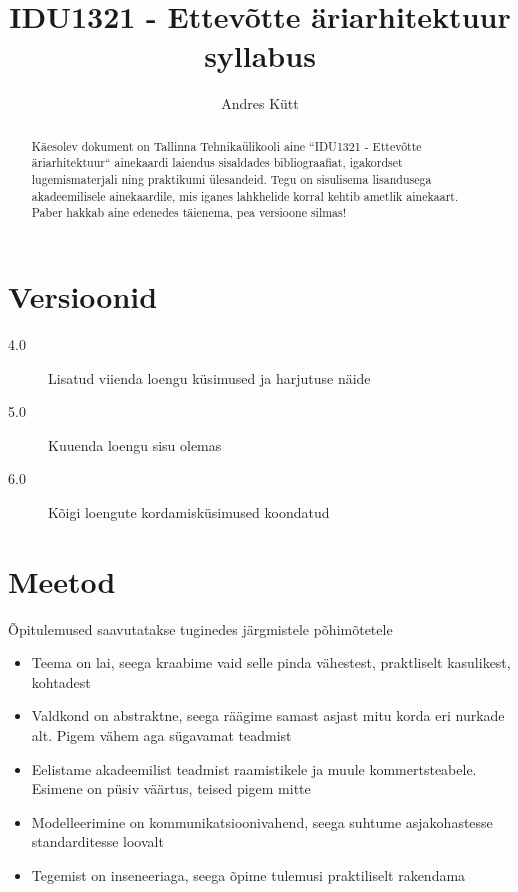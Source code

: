 \documentclass[nobib]{tufte-handout}
\title{IDU1321 - Ettevõtte äriarhitektuur syllabus}
\author[Andres Kütt]{Andres Kütt}
\begin{document}
\maketitle
\begin{abstract}
\noindent
Käesolev dokument on Tallinna Tehnikaülikooli aine ``IDU1321 - Ettevõtte äriarhitektuur`` ainekaardi laiendus sisaldades bibliograafiat, igakordset lugemismaterjali ning praktikumi ülesandeid. Tegu on sisulisema lisandusega akadeemilisele ainekaardile, mis iganes lahkhelide korral kehtib ametlik ainekaart. Paber hakkab aine edenedes täienema, pea versioone silmas!
\end{abstract}

\section{Versioonid}
\begin{description}
	\item[4.0] Lisatud viienda loengu küsimused ja harjutuse näide
	\item[5.0] Kuuenda loengu sisu olemas
	\item[6.0] Kõigi loengute kordamisküsimused koondatud
\end{description}

\section{Meetod}
Õpitulemused saavutatakse tuginedes järgmistele põhimõtetele
\begin{itemize}
	\item Teema on lai, seega kraabime vaid selle pinda vähestest, praktliselt kasulikest, kohtadest
	\item Valdkond on abstraktne, seega räägime samast asjast mitu korda eri nurkade alt. Pigem vähem aga sügavamat teadmist
	\item Eelistame akadeemilist teadmist raamistikele ja muule kommertsteabele. Esimene on püsiv väärtus, teised pigem mitte
	\item Modelleerimine on kommunikatsioonivahend, seega suhtume asjakohastesse standarditesse loovalt
	\item Tegemist on inseneeriaga, seega õpime tulemusi praktiliselt rakendama
\end{itemize}
\end{document}

